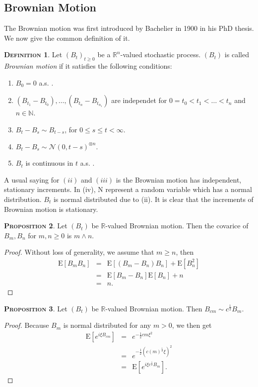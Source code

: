 \documentclass[a4paper, twoside, 11pt]{article}
\theoremstyle{definition}
\newtheorem{definition}{\scshape Definition}[section]
\newtheorem{proposition}[definition]{\scshape Proposition}
\begin{document}
\subsection{Brownian Motion}
The Brownian motion was first introduced by Bachelier in 1900 in his PhD thesis. We now give the common definition of it.
\begin{definition}
Let $(B_t)_{t\ge0}$ be a $\mathbb{R}^{n}$-valued stochastic process. $(B_t)$ is called \emph{Brownian motion} if it satisfies the following conditions:
\begin{enumerate}[topsep=0pt, itemsep=-1ex, partopsep=1ex, parsep=1ex, label=(\roman*)]
  \item $B_0 = 0 $ a.s. .
  \item $(B_{t_1} - B_{t_0}),\dots,(B_{t_n} - B_{t_{n_1}})$ are independet for $0=t_0<t_1<\dots<t_n$ and $n \in \mathbb{N}$.
  \item $B_t - B_s \sim B_{t-s}$, for $0 \le s \le t < \infty$.
  \item $B_t - B_s \sim \mathcal{N}(0, t-s)^{\otimes n}$.
  \item $B_t$ is continuous in $t$ a.s. .
\end{enumerate}
\end{definition}
A usual saying for $(ii)$ and $(iii)$ is the Brownian motion has independent, stationary increments. In (iv), $\mathrm{N}$ represent a random variable which has a normal distribution. $B_t$ is normal distributed due to (ii). It is clear that the increments of Brownian motion is stationary.

\begin{proposition}
  Let $(B_t)$ be $\mathbb{R}$-valued Brownian motion. Then the covarice of $B_m, B_n$ for $m, n \ge 0$ is $m \wedge n $.
\end{proposition}
\begin{proof}
  Without loss of generality, we assume that $m \ge n$, then
  \begin{eqnarray*}
	\mathrm{E}[B_mB_n] &=& \mathrm{E}[(B_m - B_n)B_n] + \mathrm{E}[B_n^2]\\
	&=& \mathrm{E}[B_m - B_n]\mathrm{E}[B_n] + n\\
	&=& n .
  \end{eqnarray*}
  \label{sec:cor}
\end{proof}

\begin{proposition}
  Let $(B_t)$ be  $\mathbb{R}$-valued Brownian motion. Then $B_{cm} \sim c^{\frac{1}{2}}B_m$.
\end{proposition}
\begin{proof}
  Because $B_m$ is normal distributed for any $m > 0$, we then get
  \begin{eqnarray*}
	\mathrm{E} [e^{i\xi B_{cm}}] &=& e^{-\frac{1}{2}cm\xi^2}\\
	&=& e^{-\frac{1}{2}(c(m)^{\frac{1}{2}}\xi)^2}\\
	&=& \mathrm{E} [e^{i\xi c^{\frac{1}{2}}B_m}] .
  \end{eqnarray*}
\end{proof}
\end{document}
